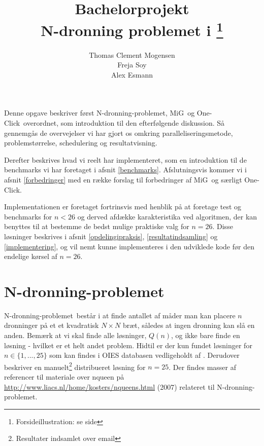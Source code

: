 \documentclass[draft,a4paper,11pt]{article}
\title{Bachelorprojekt\\N-dronning problemet i \mig\footnote{Forsideillustration: se side \pageref{fig:action}}}
\author{Thomas Clement Mogensen \\ Freja Soy \\ Alex Esmann}
\newcommand{\mig}{MiG}
\newcommand{\oc}{One-Click}
\newcommand{\nq}{N-dronning-problemet}
\renewcommand{\thepage}{\roman{page}}
\begin{document}
\maketitle
\tableofcontents
\listoffixmes
\newpage

\renewcommand{\thepage}{\arabic{page}}
\pagestyle{fancy}                              %
\fancyhead[R]{\thepage\ af \pageref{LastPage}} %
\fancyhead[L]{\nq\ i \mig}              %
\fancyfoot[C]{}                                %
\setcounter{page}{1}

\abstract
Denne opgave beskriver først \nq, \mig\ og \oc\ overordnet, som introduktion til den efterfølgende diskussion. Så gennemgås de overvejelser vi har gjort os omkring paralleliseringsmetode, problemstørrelse, schedulering og resultatvisning. 

Derefter beskrives hvad vi reelt har implementeret, som en introduktion til de benchmarks vi har foretaget i afsnit \ref{benchmarks}. 
Afslutningsvis kommer vi i afsnit \ref{forbedringer} med en række forslag til forbedringer af \mig\ og særligt \oc.

Implementationen er foretaget fortrinsvis med henblik på at foretage test og benchmarks for $n<26$ og derved afdække karakteristika ved algoritmen, der kan benyttes til at bestemme de bedst mulige praktiske valg for $n=26$. Disse løsninger beskrives i afsnit \ref{opdelingipraksis}, \ref{resultatindsamling} og \ref{implementering}, og vil nemt kunne implementeres i den udviklede kode før den endelige kørsel af $n=26$.


\section{\nq}\label{nqueenproblemet}

\nq\ består i at finde antallet af måder man kan placere $n$ dronninger på et et kvadratisk $N \times N$ bræt, således at ingen dronning kan slå en anden. Bemærk at vi skal finde alle løsninger, $Q(n)$, og ikke bare finde en løsning - hvilket er et helt andet problem. Hidtil er der kun fundet løsninger for $n \in \{1,...,25\}$ som kan findes i OIES databasen vedligeholdt af \citep{sekvenser}. Derudover beskriver \cite{etsi} en manuelt\footnote{Resultater indsamlet over email} distribueret løsning for $n=25$. Der findes masser af referencer til materiale over nqueen på \url{http://www.liacs.nl/home/kosters/nqueens.html} (2007) relateret til \nq. 
\end{document}
